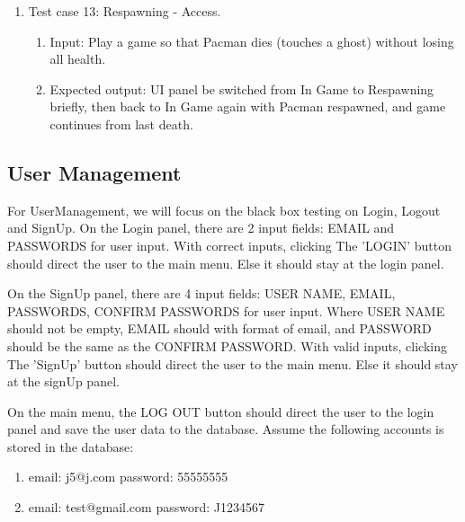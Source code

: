 \documentclass[11pt]{article}
\begin{document}
    \begin{enumerate}
        \item Test case 13: Respawning - Access.
        \begin{enumerate}
            \item  Input: Play a game so that Pacman dies (touches a ghost) without losing all health.
            \item  Expected output: UI panel be switched from In Game to Respawning briefly, then back to In Game again with Pacman respawned, and game continues from last death.
        \end{enumerate}
    \end{enumerate}
    

    \subsection{User Management}

    For UserManagement, we will focus on the black box testing on Login, Logout and SignUp.
    On the Login panel, there are 2 input fields: EMAIL and PASSWORDS for user input.
    With correct inputs, clicking The 'LOGIN' button should direct the user to the main menu. Else it should stay at the login panel.

    On the SignUp panel, there are 4 input fields: USER NAME, EMAIL, PASSWORDS, CONFIRM PASSWORDS for user input.
    Where USER NAME should not be empty, EMAIL should with format of email, and PASSWORD should be the same as the CONFIRM PASSWORD.
    With valid inputs, clicking The 'SignUp' button should direct the user to the main menu. Else it should stay at the signUp panel.

    On the main menu, the LOG OUT button should direct the user to the login panel and save the user data to the database.
    Assume the following accounts is stored in the database:
    \begin{enumerate}
        \item email: j5@j.com password: 55555555
        \item email: test@gmail.com password: J1234567
    \end{enumerate}
\end{document}
